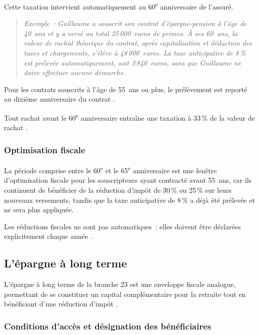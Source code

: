 ﻿\documentclass[12pt, a4paper]{article}
\begin{document}
Cette taxation intervient automatiquement au
60\textsuperscript{e} anniversaire de l'assuré. 

\begin{quote}
\textit{Exemple~: Guillaume a souscrit son contrat d'épargne-pension à l'âge de 40~ans et y a versé au total 25\,000~euros de primes. 
À ses 60~ans, la valeur de rachat théorique du contrat, 
après capitalisation et déduction des taxes et chargements, s'élève à 48\,000~euros. 
La taxe anticipative de 8\,\% est prélevée automatiquement, soit 3\,840~euros, 
sans que Guillaume ne doive effectuer aucune démarche.}
\end{quote}

Pour les contrats souscrits
à l'âge de 55~ans ou plus, le prélèvement
est reporté au dixième anniversaire du contrat \cite[art.~184]{cdtd1927}.

Tout rachat avant le
60\textsuperscript{e} anniversaire entraîne une taxation
à 33\,\% de la valeur de rachat \cite[art.~171]{cir92_2025}.

\subsubsection*{Optimisation fiscale}

La période comprise entre le 60\textsuperscript{e} et le
65\textsuperscript{e} anniversaire est une fenêtre
d'optimisation fiscale pour les souscripteurs ayant contracté avant 55~ans,
car ils continuent de
bénéficier de la réduction d'impôt de 30\,\% ou 25\,\% sur
leurs nouveaux versements, tandis que la taxe anticipative de
8\,\% a déjà été prélevée et ne sera plus appliquée. 

Les réductions fiscales ne sont pas automatiques~: elles
doivent être déclarées explicitement chaque année
\cite[art.~145\textsuperscript{9}]{cir92_2025}.

\subsection{L'épargne à long terme}

L'épargne à long terme de la branche 23 est une enveloppe fiscale analogue,
permettant de se constituer un capital complémentaire pour la
retraite tout en bénéficiant d'une réduction d'impôt
\cite[p.~115-116]{Binon2016}.

\subsubsection*{Conditions d'accès et désignation des
bénéficiaires}
\end{document}
